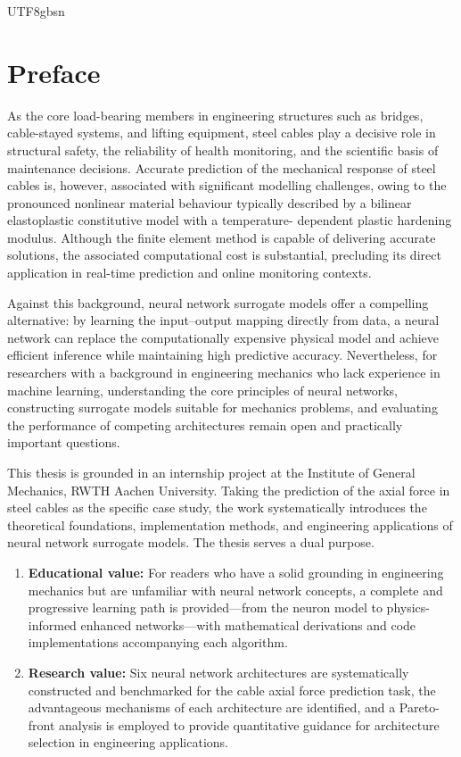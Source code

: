 \documentclass[a4paper,12pt]{report}
\begin{document}
\begin{CJK}{UTF8}{gbsn}
\tableofcontents

\chapter*{Preface}

As the core load-bearing members in engineering structures such as bridges, cable-stayed
systems, and lifting equipment, steel cables play a decisive role in structural safety,
the reliability of health monitoring, and the scientific basis of maintenance decisions.
Accurate prediction of the mechanical response of steel cables is, however, associated
with significant modelling challenges, owing to the pronounced nonlinear material behaviour
typically described by a bilinear elastoplastic constitutive model with a temperature-
dependent plastic hardening modulus. Although the finite element method is capable of
delivering accurate solutions, the associated computational cost is substantial, precluding
its direct application in real-time prediction and online monitoring contexts.

Against this background, neural network surrogate models offer a compelling alternative:
by learning the input--output mapping directly from data, a neural network can replace
the computationally expensive physical model and achieve efficient inference while
maintaining high predictive accuracy. Nevertheless, for researchers with a background in
engineering mechanics who lack experience in machine learning, understanding the core
principles of neural networks, constructing surrogate models suitable for mechanics
problems, and evaluating the performance of competing architectures remain open and
practically important questions.

This thesis is grounded in an internship project at the Institute of General Mechanics,
RWTH Aachen University. Taking the prediction of the axial force in steel cables as the
specific case study, the work systematically introduces the theoretical foundations,
implementation methods, and engineering applications of neural network surrogate models.
The thesis serves a dual purpose.

\begin{enumerate}
  \item \textbf{Educational value:} For readers who have a solid grounding in engineering
    mechanics but are unfamiliar with neural network concepts, a complete and progressive
    learning path is provided---from the neuron model to physics-informed enhanced
    networks---with mathematical derivations and code implementations accompanying each
    algorithm.
  \item \textbf{Research value:} Six neural network architectures are systematically
    constructed and benchmarked for the cable axial force prediction task, the advantageous
    mechanisms of each architecture are identified, and a Pareto-front analysis is employed
    to provide quantitative guidance for architecture selection in engineering applications.
\end{enumerate}


\end{CJK}
\end{document}
